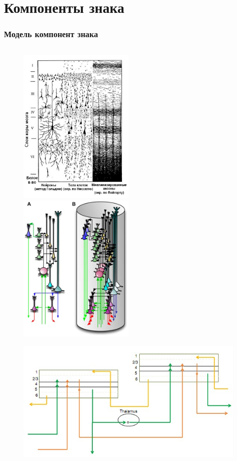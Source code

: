 \documentclass[default]{beamer}
\begin{document}
	\section{Компоненты знака}
	\begin{frame}
		\frametitle{Модель компонент знака}
		
		\begin{columns}
			\begin{column}{0.3\textwidth}
				\begin{figure}
					\includegraphics[width=0.5\textwidth]{phisio/column_layers_ru}
					\includegraphics[width=0.5\textwidth]{phisio/column}
					\par\bigskip
					\includegraphics[width=\textwidth]{mpf/regions_connect}

\end{figure}
\end{column}
\end{columns}
\end{frame}
\end{document}
